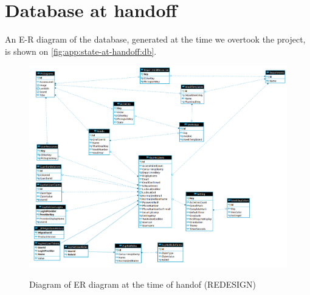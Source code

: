 \section{Database at handoff}\label{app:state-at-handoff:db}

An E-R diagram of the database, generated at the time we overtook the project, is shown on \autoref{fig:app:state-at-handoff:db}.

\begin{figure}[h]
    \centering
    \caption{Diagram of ER diagram at the time of handof (REDESIGN)}
    \includegraphics[width=1\textwidth]{figures/db_ho.png}
    \label{fig:app:state-at-handoff:db}
\end{figure}
